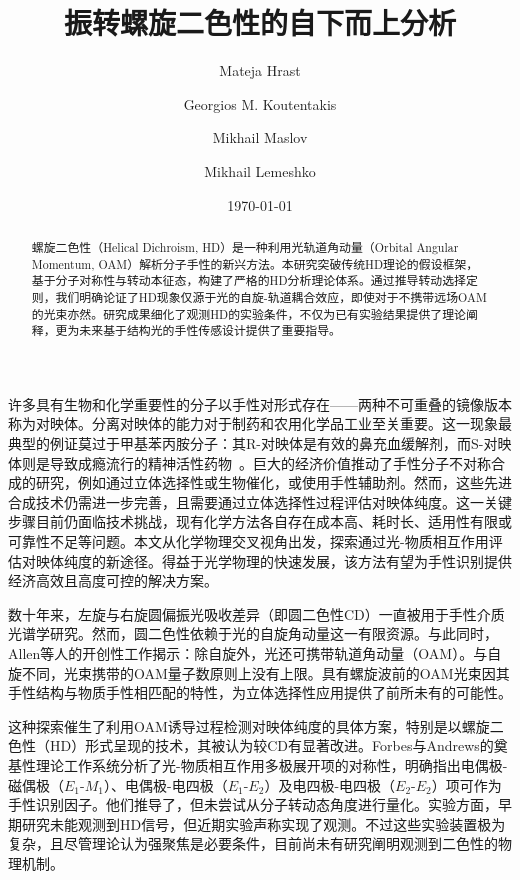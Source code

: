 \documentclass[reprint,aps,prl,twocolumn,superscriptaddress,groupedaddress]{revtex4-2}
\newcommand{\eomo}{$E_1$-$M_1$}
\newcommand{\eoet}{$E_1$-$E_2$}
\newcommand{\etet}{$E_2$-$E_2$}
\begin{document}
\title{振转螺旋二色性的自下而上分析}
\author{Mateja Hrast}
\author{Georgios M. Koutentakis}
\author{Mikhail Maslov}
\author{Mikhail Lemeshko}
\date{\today}
\begin{abstract}
螺旋二色性（Helical Dichroism, HD）是一种利用光轨道角动量（Orbital Angular Momentum, OAM）解析分子手性的新兴方法。本研究突破传统HD理论的假设框架，基于分子对称性与转动本征态，构建了严格的HD分析理论体系。通过推导转动选择定则，我们明确论证了HD现象仅源于光的自旋-轨道耦合效应，即使对于不携带远场OAM的光束亦然。研究成果细化了观测HD的实验条件，不仅为已有实验结果提供了理论阐释，更为未来基于结构光的手性传感设计提供了重要指导。
\end{abstract}
\maketitle
许多具有生物和化学重要性的分子以手性对形式存在——两种不可重叠的镜像版本称为对映体。分离对映体的能力对于制药和农用化学品工业至关重要\cite{MAIER2001}。这一现象最典型的例证莫过于甲基苯丙胺分子：其R-对映体是有效的鼻充血缓解剂，而S-对映体则是导致成瘾流行的精神活性药物~\cite{barkholtz2023}。巨大的经济价值推动了手性分子不对称合成的研究，例如通过立体选择性或生物催化，或使用手性辅助剂\cite{Brown1989}。然而，这些先进合成技术仍需进一步完善，且需要通过立体选择性过程评估对映体纯度。这一关键步骤目前仍面临技术挑战，现有化学方法各自存在成本高、耗时长、适用性有限或可靠性不足等问题\cite{qian2023}。本文从化学物理交叉视角出发，探索通过光-物质相互作用评估对映体纯度的新途径。得益于光学物理的快速发展\cite{Koch2019}，该方法有望为手性识别提供经济高效且高度可控的解决方案。

数十年来，左旋与右旋圆偏振光吸收差异（即圆二色性CD）\cite{deutsche1970,Holzwarth1974}一直被用于手性介质光谱学研究\cite{Miles2021}。然而，圆二色性依赖于光的自旋角动量这一有限资源。与此同时，Allen等人\cite{Allen1992}的开创性工作揭示：除自旋外，光还可携带轨道角动量（OAM）。与自旋不同，光束携带的OAM量子数原则上没有上限。具有螺旋波前的OAM光束因其手性结构与物质手性相匹配的特性，为立体选择性应用提供了前所未有的可能性。

这种探索催生了利用OAM诱导过程检测对映体纯度的具体方案，特别是以螺旋二色性（HD）\cite{ANDREWS2004,Ye2019,Li2021}形式呈现的技术，其被认为较CD有显著改进\cite{Ye2019,Li2021}。Forbes与Andrews的奠基性理论工作\cite{Forbes2018,Forbes2019,Forbes2021}系统分析了光-物质相互作用多极展开项的对称性，明确指出电偶极-磁偶极（\eomo）、电偶极-电四极（\eoet）及电四极-电四极（\etet）项可作为手性识别因子。他们推导了，但未尝试从分子转动态角度进行量化。实验方面，早期研究未能观测到HD信号\cite{Araoka2005,Loeffler2011}，但近期实验声称实现了观测\cite{Rusak2019,Zhang2020,Rouxel2022,Begin2023,Jain2023}。不过这些实验装置极为复杂，且尽管理论认为强聚焦是必要条件\cite{Forbes2019}，目前尚未有研究阐明观测到二色性的物理机制。
\end{document}

